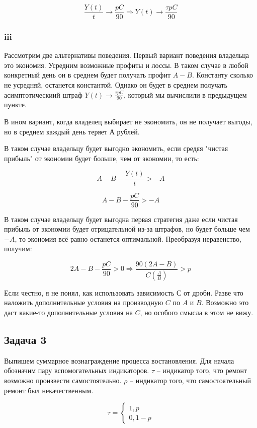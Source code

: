 \documentclass[a4paper,12pt]{article}
\def \t{\tau}
\begin{document}
\[ \frac{Y(t)}{t} \to \frac{p C}{90} \Rightarrow Y(t) \to \frac{\tau p C}{90}\]


\subsubsection{iii}

Рассмотрим две альтернативы поведения. Первый вариант поведения владельца это экономия. Усредним возможные профиты и лоссы. В таком случае в любой конкретный день он в среднем будет получать профит $ A - B $. Константу сколько не усредняй, останется константой. Однако он будет в среднем получать асимптотическиий штраф  $ Y(t) \to \frac{\t p C}{90} $, который мы вычислили в предыдущем пункте.

В ином вариант, когда владелец выбирает не экономить, он не получает выгоды, но в среднем каждый день теряет $ А $ рублей.

 В таком случае владельцу будет выгодно экономить, если средяя "чистая прибыль" от экономии будет больше, чем от экономии, то есть:
 
 \[ A - B - \frac{Y(t)}{t} > -A \]
 
 \[ A - B - \frac{p C}{90} > -A \]
 
 В таком случае владельцу будет выгодна первая стратегия даже если чистая прибыль от экономии будет отрицательной из-за штрафов, но будет больше чем $ -A $, то экономия всё равно останется оптимальной. Преобразуя неравенство, получим:
 
 \[  2A - B - \frac{pC}{90} > 0 \Rightarrow \frac{90(2A-B)}{C(\frac{A}{B})} > p\]
 
 Если честно, я не понял, как использовать зависимость $ С $ от дроби. Разве что наложить дополнительные условия на производную $ C $ по $ A $ и $ B $. Возможно это даст какие-то дополнительные условия на $ C $, но особого смысла в этом не вижу.
 
 \subsection{Задача 3}
 
 Выпишем суммарное вознаграждение процесса востановления. Для начала обозначим пару вспомогательных индикаторов. $ \tau $ -- индикатор того, что ремонт возможно произвести самостоятельно. $ \rho $ -- индикатор того, что самостоятельный ремонт был некачественным. \
 
 \[\tau = \begin{cases}
 1,  p\\
 0, 1-p
 \end{cases}  \]
 
\end{document}
